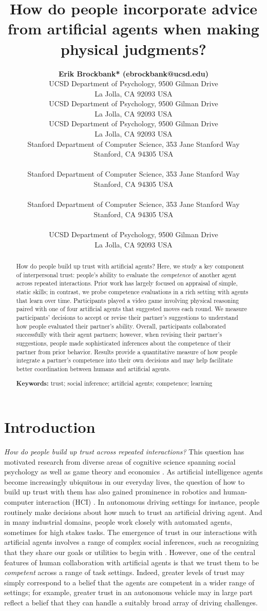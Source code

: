 \documentclass[10pt,letterpaper]{article}
\title{How do people incorporate advice from artificial agents when making physical judgments?}
\author{
  {
  \large \bf Erik Brockbank* (ebrockbank@ucsd.edu)} \\
  UCSD Department of Psychology, 9500 Gilman Drive \\
  La Jolla, CA 92093 USA
  \AND {\large \bf Haoliang Wang* (haw027@ucsd.edu)} \\
  UCSD Department of Psychology, 9500 Gilman Drive \\
  La Jolla, CA 92093 USA
  \AND {\large \bf Justin Yang (juy003@ucsd.edu)} \\
  UCSD Department of Psychology, 9500 Gilman Drive \\
  La Jolla, CA 92093 USA
  \AND {\large \bf Suvir Mirchandani (suvir@cs.stanford.edu)} \\
  Stanford Department of Computer Science, 353 Jane Stanford Way \\
  Stanford, CA 94305 USA \\
  \AND {\large \bf Erdem Biyik (ebiyik@stanford.edu)} \\
  Stanford Department of Computer Science, 353 Jane Stanford Way \\
  Stanford, CA 94305 USA \\
  \AND {\large \bf Dorsa Sadigh (dorsa@cs.stanford.edu)} \\
  Stanford Department of Computer Science, 353 Jane Stanford Way \\
  Stanford, CA 94305 USA \\
  \AND {\large \bf Judith Fan (jefan@ucsd.edu)} \\
  UCSD Department of Psychology, 9500 Gilman Drive \\
  La Jolla, CA 92093 USA \\
}
\begin{document}
\maketitle


\begin{abstract}
How do people build up trust with artificial agents? Here, we study a key component of interpersonal trust: people's ability to evaluate the \textit{competence} of another agent across repeated interactions. Prior work has largely focused on appraisal of simple, static skills; in contrast, we probe competence evaluations in a rich setting with agents that learn over time. Participants played a video game involving physical reasoning paired with one of four artificial agents that suggested moves each round. We measure participants' decisions to accept or revise their partner's suggestions to understand how people evaluated their partner's ability. Overall, participants collaborated successfully with their agent partners; however, when revising their partner's suggestions, people made sophisticated inferences about the competence of their partner from prior behavior. Results provide a quantitative measure of how people integrate a partner's competence into their own decisions and may help facilitate better coordination between humans and artificial agents.

\textbf{Keywords:} 
trust; social inference; artificial agents; competence; learning 
\end{abstract}



\section{Introduction}

\textit{How do people build up trust across repeated interactions?} This question has motivated research from diverse areas of cognitive science spanning social psychology \cite{simpson2007psychological, deutsch1973resolution} as well as game theory and economics \cite{camerer1988experimental, berg1995trust}. As artificial intelligence agents become increasingly ubiquitous in our everyday lives, the question of how to build up trust with them has also gained prominence in robotics and human-computer interaction (HCI) \cite{soh2020multi, chen2020trust}. 
In autonomous driving settings for instance, people routinely make decisions about how much to trust an artificial driving agent. And in many industrial domains, people work closely with automated agents, sometimes for high stakes tasks. The emergence of trust in our interactions with artificial agents involves a range of complex social inferences, such as recognizing that they share our goals or utilities to begin with \cite{serrino2019finding}. However, one of the central features of human collaboration with artificial agents is that we trust them to be \textit{competent} across a range of task settings. Indeed, greater levels of trust may simply correspond to a belief that the agents are competent in a wider range of settings; for example, greater trust in an autonomous vehicle may in large part reflect a belief that they can handle a suitably broad array of driving challenges.
\end{document}
